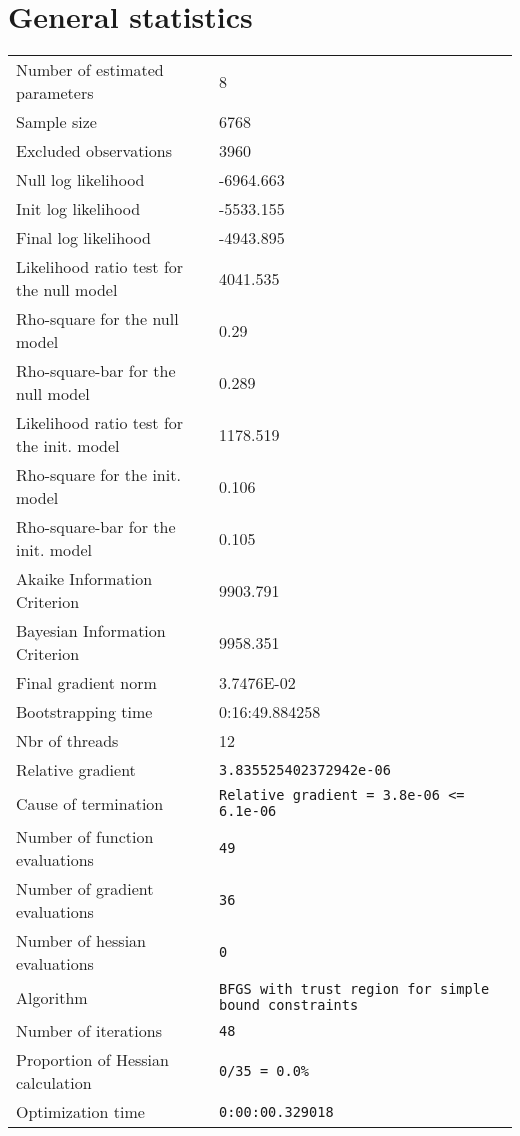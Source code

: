 \section{General statistics}
\begin{tabular}{ll}
Number of estimated parameters & 8 \\
Sample size & 6768 \\
Excluded observations & 3960 \\
Null log likelihood & -6964.663 \\
Init log likelihood & -5533.155 \\
Final log likelihood & -4943.895 \\
Likelihood ratio test for the null model & 4041.535 \\
Rho-square for the null model & 0.29 \\
Rho-square-bar for the null model & 0.289 \\
Likelihood ratio test for the init. model & 1178.519 \\
Rho-square for the init. model & 0.106 \\
Rho-square-bar for the init. model & 0.105 \\
Akaike Information Criterion & 9903.791 \\
Bayesian Information Criterion & 9958.351 \\
Final gradient norm & 3.7476E-02 \\
Bootstrapping time & 0:16:49.884258 \\
Nbr of threads & 12 \\
Relative gradient & \verb$3.835525402372942e-06$ \\
Cause of termination & \verb$Relative gradient = 3.8e-06 <= 6.1e-06$ \\
Number of function evaluations & \verb$49$ \\
Number of gradient evaluations & \verb$36$ \\
Number of hessian evaluations & \verb$0$ \\
Algorithm & \verb$BFGS with trust region for simple bound constraints$ \\
Number of iterations & \verb$48$ \\
Proportion of Hessian calculation & \verb$0/35 = 0.0%$ \\
Optimization time & \verb$0:00:00.329018$ \\
\end{tabular}

